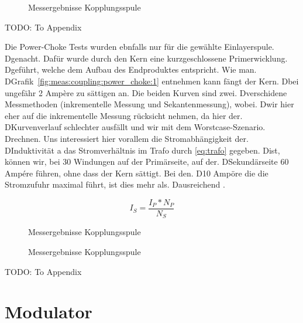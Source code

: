 \begin{figure}[h!tb]
    \centering
    
    \caption[Messresultate Kopplungsspule]{Messergebnisse Kopplungsspule}
    \label{fig:meas:coupling:coil:R}
\end{figure}
TODO: To Appendix

Die Power-Choke Tests wurden ebnfalls  nur f\"ur die gew\"ahlte Einlayerspule.
Dgenacht. Daf\"ur wurde  durch den Kern eine  kurzgeschlossene Primerwicklung.
Dgef\"uhrt,   welche  dem   Aufbau  des   Endproduktes  entspricht. Wie   man.
DGrafik~\ref{fig:meas:coupling:power_choke:1} entnehmen kann f\"angt der Kern.
Dbei  ungef\"ahr 2  Ampère zu  s\"attigen  an. Die beiden  Kurven sind  zwei.
Dverschidene Messmethoden (inkrementelle  Messung und Sekantenmessung), wobei.
Dwir hier eher auf die inkrementelle  Messung r\"ucksicht nehmen, da hier der.
DKurvenverlauf  schlechter  ausf\"allt  und wir  mit  dem  Worstcase-Szenario.
Drechnen. Uns   interessiert  hier   vorallem  die   Stromabh\"angigkeit  der.
DInduktivit\"at a das Stromverh\"altnis im Trafo durch \ref{eq:trafo} gegeben.
Dist,  k\"onnen  wir,  bei  30  Windungen  auf  der  Prim\"arseite,  auf  der.
DSekund\"arseite 60 Ampére  f\"uhren, ohne dass der  Kern s\"attigt. Bei den.
D10  Amp\"ore  die  die  Stromzufuhr  maximal  f\"uhrt,  ist  dies  mehr  als.
Dausreichend                                                                 .

\begin{equation}\label{eq:trafo}
    I_S = \frac{I_P * N_P}{N_S}
\end{equation}

\begin{figure}[h!tb]
    \centering
    
    \caption[Messresultate Kopplungsspule]{Messergebnisse Kopplungsspule}
    \label{fig:meas:coupling:coil:power_choke:1}
\end{figure}

\begin{figure}[h!tb]
    \centering
    
    \caption[Messresultate Kopplungsspule]{Messergebnisse Kopplungsspule}
    \label{fig:meas:coupling:coil:power_choke:2}
\end{figure}
TODO: To Appendix

\section{Modulator}
\label{sec:val:modulator}

